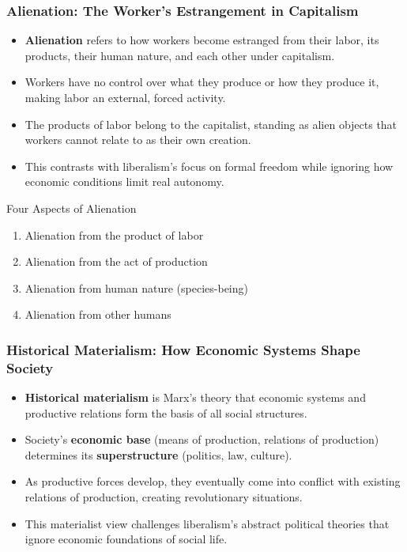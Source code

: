 \documentclass{beamer}
\begin{document}
\begin{frame}
\frametitle{Alienation: The Worker's Estrangement in Capitalism}
\begin{itemize}
    \item \textbf{Alienation} refers to how workers become estranged from their labor, its products, their human nature, and each other under capitalism.
    \item Workers have no control over what they produce or how they produce it, making labor an external, forced activity.
    \item The products of labor belong to the capitalist, standing as alien objects that workers cannot relate to as their own creation.
    \item This contrasts with liberalism's focus on formal freedom while ignoring how economic conditions limit real autonomy.
\end{itemize}

\begin{block}{Four Aspects of Alienation}
\begin{enumerate}
    \item Alienation from the product of labor
    \item Alienation from the act of production
    \item Alienation from human nature (species-being)
    \item Alienation from other humans
\end{enumerate}
\end{block}
\end{frame}

\begin{frame}
\frametitle{Historical Materialism: How Economic Systems Shape Society}
\begin{itemize}
    \item \textbf{Historical materialism} is Marx's theory that economic systems and productive relations form the basis of all social structures.
    \item Society's \textbf{economic base} (means of production, relations of production) determines its \textbf{superstructure} (politics, law, culture).
    \item As productive forces develop, they eventually come into conflict with existing relations of production, creating revolutionary situations.
    \item This materialist view challenges liberalism's abstract political theories that ignore economic foundations of social life.
\end{itemize}

\begin{center}
\end{center}
\end{frame}
\end{document}
